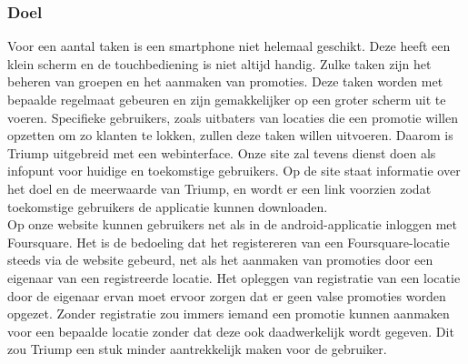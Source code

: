 \subsubsection{Doel}
Voor een aantal taken is een smartphone niet helemaal geschikt. Deze heeft een klein scherm en de touchbediening is niet altijd handig. Zulke taken zijn het beheren van groepen en het aanmaken van promoties.
Deze taken worden met bepaalde regelmaat gebeuren en zijn gemakkelijker op een groter scherm uit te voeren. Specifieke gebruikers, zoals uitbaters van locaties die een promotie willen opzetten om zo klanten te lokken, zullen deze taken willen uitvoeren. Daarom is Triump uitgebreid met een webinterface.
Onze site zal tevens dienst doen als infopunt voor huidige en toekomstige gebruikers. Op de site staat informatie over het doel en de meerwaarde van Triump, en wordt er een link voorzien zodat toekomstige gebruikers de applicatie kunnen downloaden.\\
Op onze website kunnen gebruikers net als in de android-applicatie inloggen met Foursquare. Het is de bedoeling dat het registereren van een Foursquare-locatie steeds via de website gebeurd, net als het aanmaken van promoties door een eigenaar van een registreerde locatie. Het opleggen van registratie van een locatie door de eigenaar ervan moet ervoor zorgen dat er geen valse promoties worden opgezet. Zonder registratie zou immers iemand een promotie kunnen aanmaken voor een bepaalde locatie zonder dat deze ook daadwerkelijk wordt gegeven. Dit zou Triump een stuk minder aantrekkelijk maken voor de gebruiker.

